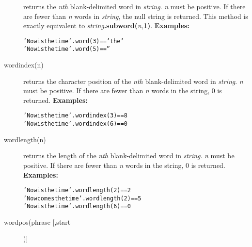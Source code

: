 \begin{description}
returns the \emph{n}\emph{th} blank-delimited word in
\emph{string}.
\emph{n} must be positive.
If there are fewer than \emph{n} words in \emph{string}, the
null string is returned.
This method is exactly equivalent to
\emph{string}\textbf{.subword(}\emph{n},\textbf{1)}.
 \textbf{Examples:}
\begin{alltt}
'Now is the time'.word(3) == 'the'
'Now is the time'.word(5) == ''
\end{alltt}
\item[wordindex(n)]\label{refwordind}

returns the character position of the \emph{n}\emph{th}
blank-delimited word in \emph{string}.
\emph{n} must be positive.
If there are fewer than \emph{n} words in the string, 0 is returned.
 \textbf{Examples:}
\begin{alltt}
'Now is the time'.wordindex(3) == 8
'Now is the time'.wordindex(6) == 0
\end{alltt}
\item[wordlength(n)]\label{refwordlen}

returns the length of the \emph{n}\emph{th} blank-delimited word in
\emph{string}.
\emph{n} must be positive.
If there are fewer than \emph{n} words in the string, 0 is returned.
 \textbf{Examples:}
\begin{alltt}
'Now is the time'.wordlength(2)    == 2
'Now comes the time'.wordlength(2) == 5
'Now is the time'.wordlength(6)    == 0
\end{alltt}
\item[wordpos(phrase [,start])]\label{refwordpos}


\end{description}
